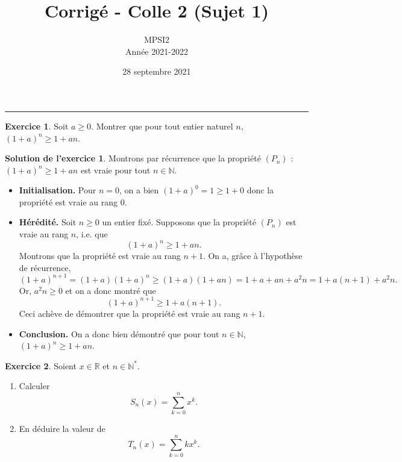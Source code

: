\documentclass[a4paper, 11pt,openany]{article}%
\title{Corrigé - Colle 2 (Sujet 1)}
\author{MPSI2\\
Année 2021-2022}
\date{28 septembre 2021}
\theoremstyle{plain}
\theoremstyle{definition}
\newtheorem{exo}{Exercice}
\newtheorem{sol}{Solution de l'exercice}
\theoremstyle{remark}
\newcommand{\R}{\mathbb{R}}
\newcommand{\N}{\mathbb{N}}
\begin{document}
   \maketitle
      \rule{\linewidth}{0.5mm}

\begin{exo}
Soit $a\geqslant 0$. Montrer que pour tout entier naturel $n$, $(1+a)^n\geqslant 1+an$.
\end{exo}


\begin{sol}
Montrons par récurrence que la propriété $(P_n)$ : $(1+a)^n \geqslant 1 +an$ est vraie pour tout $n \in \N$.
 \begin{itemize}
 \item \textbf{Initialisation.} Pour $n = 0$, on a bien $(1+a)^0 = 1 \geqslant 1+0$ donc la propriété est vraie au rang $0$.
 \item \textbf{Hérédité.} Soit $n \geqslant 0$ un entier fixé. Supposons que la propriété $(P_n)$ est vraie au rang $n$, i.e. que \[ (1+a)^n \geqslant 1 +an.\]
 Montrons que la propriété est vraie au rang $n+1$. On a, grâce à l'hypothèse de récurrence,
 \[(1+a)^{n+1} = (1+a)(1+a)^n \geqslant (1+a)(1 +an) = 1 + a + an + a^2n = 1 + a(n+1) + a^2 n.\]
 Or, $a^2 n \geqslant 0$ et on a donc montré que 
 \[(1+a)^{n+1} \geqslant 1 + a(n+1).\]
 Ceci achève de démontrer que la propriété est vraie au rang $n+1$.
 \item \textbf{Conclusion.} On a donc bien démontré que pour tout $n \in \N$, $(1+a)^n \geqslant 1 +an$.
 \end{itemize}
\end{sol}



\begin{exo}
	Soient $x\in \R$ et $n\in \N^*$.
	\begin{enumerate}
		\item Calculer \[ S_n(x) = \sum_{k=0}^n x^k.\]
		\item En déduire la valeur de $$T_n(x) = \sum_{k=0}^n kx^k.$$
	\end{enumerate}
\end{exo}
\end{document}
